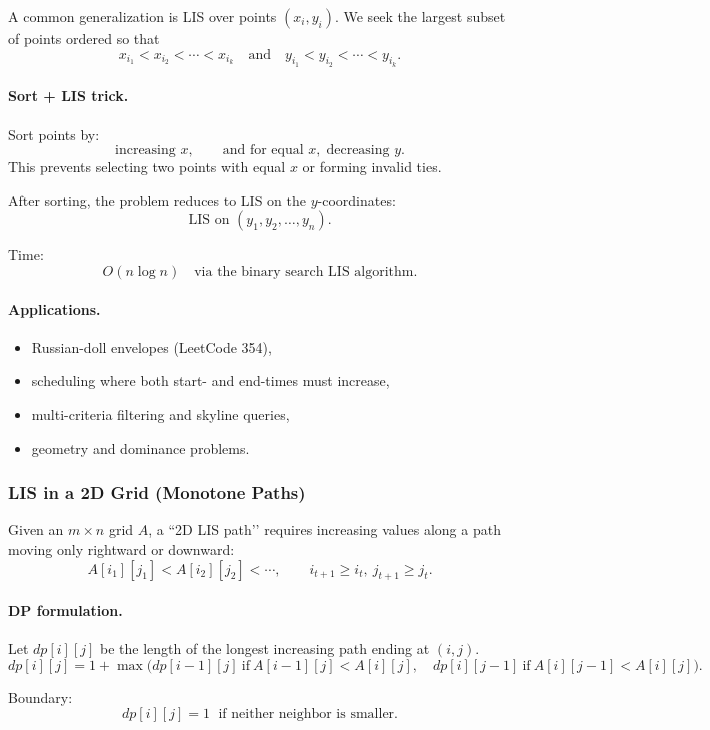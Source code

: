 \documentclass[9pt]{extarticle}
\begin{document}
A common generalization is LIS over points $(x_i,y_i)$.
We seek the largest subset of points ordered so that
\[
x_{i_1} < x_{i_2} < \cdots < x_{i_k}
\quad\text{and}\quad
y_{i_1} < y_{i_2} < \cdots < y_{i_k}.
\]

\paragraph{Sort + LIS trick.}
Sort points by:
\[
\text{increasing } x,\qquad
\text{and for equal } x,\;\text{decreasing } y.
\]
This prevents selecting two points with equal $x$ or forming invalid ties.

After sorting, the problem reduces to LIS on the $y$-coordinates:
\[
\text{LIS on } (y_1,y_2,\dots,y_n).
\]

Time:
\[
O(n\log n) \quad \text{via the binary search LIS algorithm}.
\]

\paragraph{Applications.}
\begin{itemize}
    \item Russian-doll envelopes (LeetCode 354),
    \item scheduling where both start- and end-times must increase,
    \item multi-criteria filtering and skyline queries,
    \item geometry and dominance problems.
\end{itemize}

\subsubsection{LIS in a 2D Grid (Monotone Paths)}

Given an $m\times n$ grid $A$, a “2D LIS path’’ requires increasing values along 
a path moving only rightward or downward:
\[
A[i_1][j_1] < A[i_2][j_2] < \cdots,
\qquad
i_{t+1} \ge i_t,\ j_{t+1} \ge j_t.
\]

\paragraph{DP formulation.}
Let $dp[i][j]$ be the length of the longest increasing path ending at $(i,j)$.
\[
dp[i][j] = 1 + \max\Big( dp[i-1][j]\ \text{if}\ A[i-1][j] < A[i][j],\quad
                         dp[i][j-1]\ \text{if}\ A[i][j-1] < A[i][j]\Big).
\]

Boundary:
\[
dp[i][j] = 1 \;\text{ if neither neighbor is smaller.}
\]
\end{document}
